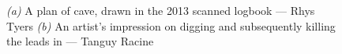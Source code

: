 	\begin{figure}[t!]
		\checkoddpage \ifoddpage \forcerectofloat \else \forceversofloat \fi
		\centering

		\begin{subfigure}{\textwidth}
			\centering
			\caption{}\label{}
		\end{subfigure}

		\begin{subfigure}{\textwidth}
			\centering
			\caption{}\label{}
		\end{subfigure}
	\caption{
		\emph{(a)} A plan of  cave, drawn in the 2013 scanned logbook --- Rhys Tyers
		\emph{(b)} An artist's impression on digging and subsequently killing the leads in  --- Tanguy Racine
		}
	
	\end{figure}

